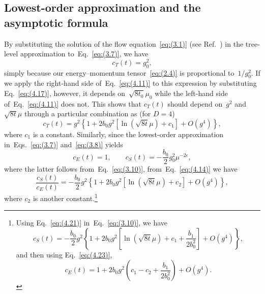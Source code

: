 \subsection{Lowest-order approximation and the asymptotic formula}
By substituting the solution of the flow equation~\eqref{eq:(3.1)} (see
Ref.~\cite{Luscher:2011bx}) in the tree-level approximation
to~Eq.~\eqref{eq:(3.7)}, we have
\begin{equation}
   c_T(t)=g_0^2,
\label{eq:(4.20)}
\end{equation}
simply because our energy--momentum tensor~\eqref{eq:(2.4)} is proportional
to~$1/g_0^2$. If we apply the right-hand side of~Eq.~\eqref{eq:(4.11)} to this
expression by substituting Eq.~\eqref{eq:(4.17)}, however, it depends
on~$\sqrt{8t_0}\mu_0$ while the left-hand side of~Eq.~\eqref{eq:(4.11)} does
not. This shows that $c_T(t)$ should depend on~$g^2$ and~$\sqrt{8t}\mu$ through
a particular combination as (for $D=4$)
\begin{equation}
   c_T(t)=
   g^2\left\{1+2b_0g^2\left[\ln(\sqrt{8t}\mu)+c_1\right]+O(g^4)\right\},
\label{eq:(4.21)}
\end{equation}
where $c_1$ is a constant. Similarly, since the lowest-order approximation
in~Eqs.~\eqref{eq:(3.7)} and~\eqref{eq:(3.8)} yields
\begin{equation}
   c_E(t)=1,\qquad
   c_S(t)=-\frac{b_0}{2}g_0^2\mu^{-2\epsilon},
\label{eq:(4.22)}
\end{equation}
where the latter follows from~Eq.~\eqref{eq:(3.10)}, from~Eq.~\eqref{eq:(4.14)}
we have
\begin{equation}
   \frac{c_S(t)}{c_E(t)}
   =-\frac{b_0}{2}
   g^2\left\{1+2b_0g^2\left[\ln(\sqrt{8t}\mu)+c_2\right]+O(g^4)\right\},
\label{eq:(4.23)}
\end{equation}
where $c_2$ is another constant.\footnote{Using Eq.~\eqref{eq:(4.21)}
in~Eq.~\eqref{eq:(3.10)}, we have
\begin{equation}
   c_S(t)=-\frac{b_0}{2}
   g^2\left\{
   1+2b_0g^2
   \left[
   \ln(\sqrt{8t}\mu)+c_1+\frac{b_1}{2b_0^2}\right]+O(g^4)
   \right\},
\label{eq:(4.24)}
\end{equation}
and then using Eq.~\eqref{eq:(4.23)},
\begin{equation}
   c_E(t)=1+2b_0g^2
   \left(c_1-c_2+\frac{b_1}{2b_0^2}\right)+O(g^4).
\label{eq:(4.25)}
\end{equation}
}

